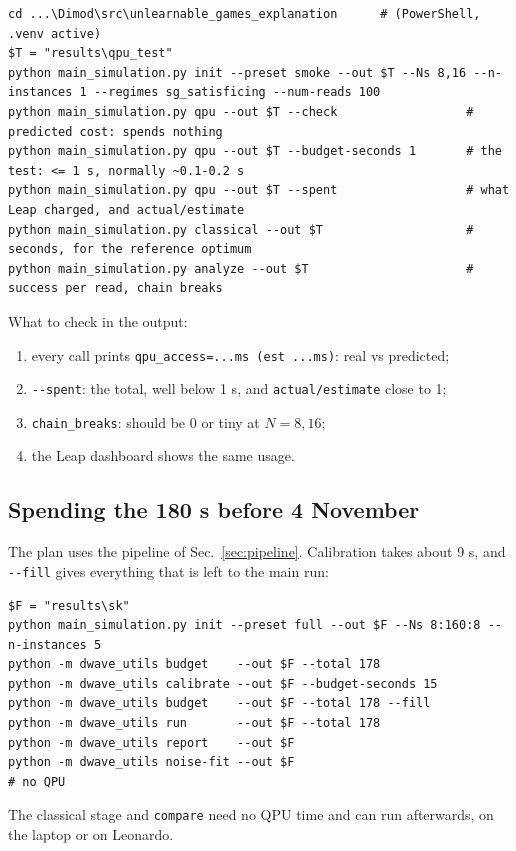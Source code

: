 \documentclass[11pt,a4paper]{article}
\newcommand{\code}[1]{\nolinkurl{#1}}
\newcommand{\src}[4]{}
\begin{document}
\begin{lstlisting}
cd ...\Dimod\src\unlearnable_games_explanation      # (PowerShell, .venv active)
$T = "results\qpu_test"
python main_simulation.py init --preset smoke --out $T --Ns 8,16 --n-instances 1 --regimes sg_satisficing --num-reads 100
python main_simulation.py qpu --out $T --check                  # predicted cost: spends nothing
python main_simulation.py qpu --out $T --budget-seconds 1       # the test: <= 1 s, normally ~0.1-0.2 s
python main_simulation.py qpu --out $T --spent                  # what Leap charged, and actual/estimate
python main_simulation.py classical --out $T                    # seconds, for the reference optimum
python main_simulation.py analyze --out $T                      # success per read, chain breaks
\end{lstlisting}
What to check in the output:
\begin{enumerate}
\item every call prints \code{qpu_access=...ms (est ...ms)}: real vs predicted;
\item \code{--spent}: the total, well below 1 s, and \code{actual/estimate} close to 1;
\item \code{chain_breaks}: should be 0 or tiny at $N=8,16$;
\item the Leap dashboard shows the same usage.
\end{enumerate}

\subsection{Spending the 180 s before 4 November}
The plan uses the pipeline of Sec.~\ref{sec:pipeline}. Calibration takes about 9 s, and \code{--fill} gives
everything that is left to the main run:
\begin{lstlisting}
$F = "results\sk"
python main_simulation.py init --preset full --out $F --Ns 8:160:8 --n-instances 5
python -m dwave_utils budget    --out $F --total 178
python -m dwave_utils calibrate --out $F --budget-seconds 15
python -m dwave_utils budget    --out $F --total 178 --fill
python -m dwave_utils run       --out $F --total 178
python -m dwave_utils report    --out $F
python -m dwave_utils noise-fit --out $F                                # no QPU
\end{lstlisting}
The classical stage and \code{compare} need no QPU time and can run afterwards, on the laptop or on Leonardo.

\end{document}
